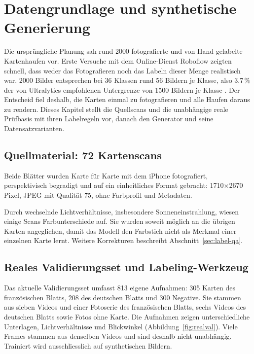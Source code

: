 \section{Datengrundlage und synthetische Generierung}\label{sec:daten}

Die ursprüngliche Planung sah rund 2000 fotografierte und von Hand gelabelte
Kartenhaufen vor. Erste Versuche mit dem Online-Dienst Roboflow zeigten
schnell, dass weder das Fotografieren noch das Labeln dieser Menge realistisch
war. 2000 Bilder entsprechen bei 36 Klassen rund 56 Bildern je Klasse, also
3.7\,\% der von Ultralytics empfohlenen Untergrenze von 1500 Bildern je Klasse
\cite{ultralytics2025tips}. Der Entscheid fiel deshalb, die Karten einmal
zu fotografieren und alle Haufen daraus zu rendern. Dieses Kapitel
stellt die Quellscans und die unabhängige reale Prüfbasis mit ihren Labelregeln vor,
danach den Generator und seine Datensatzvarianten.

\subsection{Quellmaterial: 72 Kartenscans}\label{sec:scans}

Beide Blätter wurden Karte für Karte mit dem iPhone fotografiert, perspektivisch
begradigt und auf ein einheitliches Format gebracht: 1710$\times$2670 Pixel,
JPEG mit Qualität 75, ohne Farbprofil und Metadaten.

Durch wechselnde Lichtverhältnisse, insbesondere Sonneneinstrahlung, wiesen
einige Scans Farbunterschiede auf. Sie wurden soweit möglich an die übrigen
Karten angeglichen, damit das Modell den Farbstich nicht als Merkmal einer
einzelnen Karte lernt. Weitere Korrekturen beschreibt
Abschnitt~\ref{sec:label-qa}.

\subsection{Reales Validierungsset und Labeling-Werkzeug}\label{sec:labeling}

Das aktuelle Validierungsset umfasst 813 eigene Aufnahmen: 305 Karten des
französischen Blatts, 208 des deutschen Blatts und 300 Negative. Sie stammen
aus sieben Videos und einer Fotoserie des französischen Blatts, sechs Videos
des deutschen Blatts sowie Fotos ohne Karte. Die Aufnahmen zeigen
unterschiedliche Unterlagen, Lichtverhältnisse und Blickwinkel
(Abbildung~\ref{fig:realval}). Viele Frames stammen aus denselben Videos
und sind deshalb nicht unabhängig. Trainiert wird ausschliesslich auf
synthetischen Bildern.


